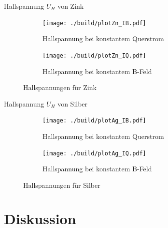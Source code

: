 
\begin{table}[H]
    \centering
    
    \caption{Hallspannung $U_H$ von Zink}
    \label{tab:}
\end{table}

\begin{figure}[H]
\begin{subfigure}{0.495\linewidth}
\centering
\texttt{[image: ./build/plotZn\_IB.pdf]}
\caption{Hallspannung bei konstantem Querstrom}
\end{subfigure}
\begin{subfigure}{0.495\linewidth}
\centering
\texttt{[image: ./build/plotZn\_IQ.pdf]}
\caption{Hallspannung bei konstantem B-Feld}
\end{subfigure}
\caption{Hallspannungen für Zink}
\end{figure}



\begin{table}[H]
    \centering
    
    \caption{Hallspannung $U_H$ von Silber}
    \label{tab:}
\end{table}

\begin{figure}[H]
\begin{subfigure}{0.495\linewidth}
\centering
\texttt{[image: ./build/plotAg\_IB.pdf]}
\caption{Hallspannung bei konstantem Querstrom}
\end{subfigure}
\begin{subfigure}{0.495\linewidth}
\centering
\texttt{[image: ./build/plotAg\_IQ.pdf]}
\caption{Hallspannung bei konstantem B-Feld}
\end{subfigure}
\caption{Hallspannungen für Silber}
\end{figure}





\section{Diskussion}



\newpage
\printbibliography

